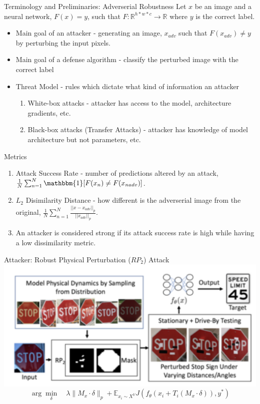 \documentclass{beamer}
\begin{document}
\begin{frame}{Terminology and Preliminaries: Adverserial Robustness}
	Let $x$ be an image and a neural network, $F(x) = y$, such that $F: \mathbb{R}^{h*w*c}\rightarrow \mathbb{R}$ where $y$ is the correct label.
	\begin{itemize}
		\item Main goal of an attacker - generating an image, $x_{adv}$ such that $F(x_{adv}) \neq y$ by perturbing the input pixels.
		\pause
		\item Main goal of a defense algorithm - classify the perturbed image with the correct label
		\pause
		\item Threat Model - rules which dictate what kind of information an attacker
		\begin{enumerate}
			\item White-box attacks - attacker has access to the model, architecture gradients, etc. \pause
			\item Black-box attacks (Transfer Attacks) - attacker has knowledge of model architecture but not parameters, etc.
		\end{enumerate}
	\end{itemize}
\end{frame}

\begin{frame}{Metrics}
	\begin{enumerate}
		\item Attack Success Rate - number of predictions altered by an attack, $\frac{1}{N}\sum_{n=1}^{N} \mathbbm{1}[F(x_n) \neq F(x_{nadv})]$.
		\pause
		\item $L_2$ Disimilarity Distance - how different is the adverserial image from the original, $\frac{1}{N}\sum^{N}_{n=1} \frac{||x - x_{adv}||_{p}}{||x_{adv}||_{p}}.$
		\pause
		\item An attacker is considered strong if its attack success rate is high while having a low dissimilarity metric.
	\end{enumerate}
\end{frame}

\begin{frame}{Attacker: Robust Physical Perturbation ($RP_2$) Attack}
	\centering
	\includegraphics[scale=0.55]{RP2.png}
	\pause
	\begin{equation*}
	\arg \min_\delta \quad \lambda\lVert M_x \cdot \delta \rVert_p + \mathbb{E}_{x_i \sim X^V} J(f_\theta(x_i + T_i(M_x \cdot \delta)), y^*)
	\end{equation*}
\end{frame}
\end{document}
